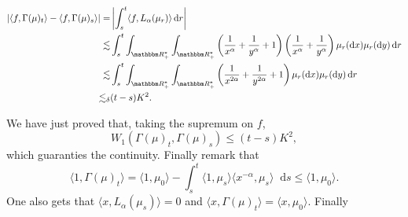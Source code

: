 \documentclass[a4paper,11pt, reqno]{amsart}
\newcommand{\dd}{\mathop{}\!\mathrm{d}}
\newcommand{\1}{\mathbbm{1}}
\theoremstyle{plain}
\theoremstyle{definition}
\begin{document}
{\begin{align*}
  | \langle f, \Gamma (\mu)_t \rangle - \langle f, \Gamma (\mu)_s \rangle | =
  & \left| \int_s^t \langle f, L_{\alpha} (\mu_r) \rangle \dd r \right|\\
  \lesssim & \int_s^t \int_{\RR^{\ast}_+} \int_{\RR^{\ast}_+}
  \left( \frac{1}{x^{\alpha}} + \frac{1}{y^{\alpha}} + 1 \right) \left(
  \frac{1}{x^{\alpha}} + \frac{1}{y^{\alpha}} \right) \mu_r (\dd x) \mu_r
  (\dd y) \dd r\\
  \lesssim & \int_s^t \int_{\RR^{\ast}_+} \int_{\RR^{\ast}_+}
  \left( \frac{1}{x^{2 \alpha}} + \frac{1}{y^{2 \alpha}} + 1 \right) \mu_r
  (\dd x) \mu_r (\dd y) \dd r\\
  \lesssim_{\delta} & (t - s) K^2 .
\end{align*}

We have just proved that, taking the supremum on $f$,
\[ W_1 (\Gamma (\mu)_t, \Gamma (\mu)_s) \le (t - s) K^2, \]
which guaranties the continuity. Finally remark that
\[ \langle 1, \Gamma (\mu)_t \rangle = \langle 1, \mu_0 \rangle - \int_s^t
   \langle 1, \mu_s \rangle \langle x^{- \alpha}, \mu_s \rangle \dd s
   \le \langle 1, \mu_0 \rangle . \]
One also gets that $\langle x, L_{\alpha} (\mu_s) \rangle = 0$ and $\langle x,
\Gamma (\mu)_t \rangle = \langle x, \mu_0 \rangle$. Finally}




\end{document}
